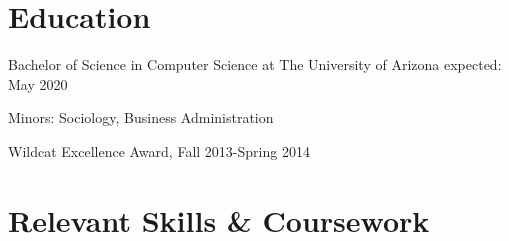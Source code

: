 \documentclass[]{friggeri-cv} %
\begin{document}
\jobdescription{}

\linecontactheader%

\section{Education}
\begin{entrylist}

\entry
{Bachelor of Science {\normalfont in Computer Science at The University of Arizona}}
{expected: May 2020}
{\item[] Minors: Sociology, Business Administration
\item[] Wildcat Excellence Award, Fall 2013-Spring 2014}


\end{entrylist}


\section{Relevant Skills \& Coursework}
\end{document}

